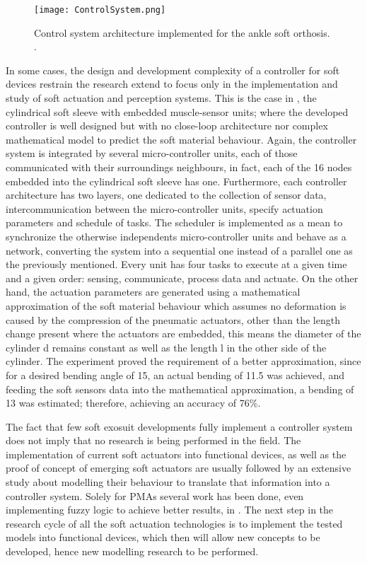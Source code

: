 \begin{figure}[h]
    \centering
    \texttt{[image: ControlSystem.png]}
    \caption{Control system architecture implemented for the ankle soft orthosis. \cite{park2011bio}. }
    \label{fig:control_system}
\end{figure}

In some cases, the design and development complexity of a controller for soft devices restrain the research extend to focus only in the implementation and study of soft actuation and perception systems. This is the case in \cite{Park2012}, the cylindrical soft sleeve with embedded muscle-sensor units; where the developed controller is well designed but with no close-loop architecture nor complex mathematical model to predict the soft material behaviour. Again, the controller system is integrated by several micro-controller units, each of those communicated with their surroundings neighbours, in fact, each of the 16 nodes embedded into the cylindrical soft sleeve has one. Furthermore, each controller architecture has two layers, one dedicated to the collection of sensor data, intercommunication between the micro-controller units, specify actuation parameters and schedule of tasks. The scheduler is implemented as a mean to synchronize the otherwise independents micro-controller units and behave as a network, converting the system into a sequential one instead of a parallel one as the previously mentioned. Every unit has four tasks to execute at a given time and a given order: sensing, communicate, process data and actuate. On the other hand, the actuation parameters are generated using a mathematical approximation of the soft material behaviour which assumes no deformation is caused by the compression of the pneumatic actuators, other than the length change present where the actuators are embedded, this means the diameter of the cylinder d remains constant as well as the length l in the other side of the cylinder. The experiment proved the requirement of a better approximation, since for a desired bending angle of 15\textdegree{}, an actual bending of 11.5\textdegree{} was achieved, and feeding the soft sensors data into the mathematical approximation, a bending of 13\textdegree{} was estimated; therefore, achieving an accuracy of 76\%.

The fact that few soft exosuit developments fully implement a controller system does not imply that no research is being performed in the field. The implementation of current soft actuators into functional devices, as well as the proof of concept of emerging soft actuators are usually followed by an extensive study about modelling their behaviour to translate that information into a controller system. Solely for PMAs several work has been done, even implementing fuzzy logic to achieve better results, in \cite{Chang2015,Skorina2015,Bishop-Moser2015,Hosovsky2016}. The next step in the research cycle of all the soft actuation technologies is to implement the tested models into functional devices, which then will allow new concepts to be developed, hence new modelling research to be performed.



